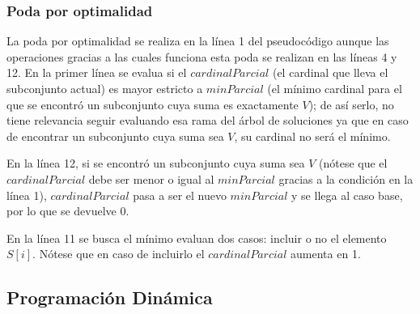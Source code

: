 \subsubsection{Poda por optimalidad}
\par La poda por optimalidad se realiza en la l\'inea 1 del pseudoc\'odigo aunque las operaciones gracias a las
cuales funciona esta poda se realizan en las l\'ineas 4 y 12. En la primer l\'inea se evalua si el $cardinalParcial$
(el cardinal que lleva el subconjunto actual) es mayor estricto a $minParcial$ (el m\'inimo cardinal para el que
se encontr\'o un subconjunto cuya suma es exactamente $V$); de as\'i serlo, no tiene relevancia seguir evaluando
esa rama del \'arbol de soluciones ya que en caso de encontrar un subconjunto cuya suma sea $V$, su cardinal no ser\'a
el m\'inimo.
\par En la l\'inea 12, si se encontr\'o un subconjunto cuya suma sea $V$ (n\'otese que el $cardinalParcial$ debe
ser menor o igual al $minParcial$ gracias a la condici\'on en la l\'inea 1), $cardinalParcial$ pasa a ser el nuevo
$minParcial$ y se llega al caso base, por lo que se devuelve 0.
\par En la l\'inea 11 se busca el m\'inimo evaluan dos casos: incluir o no el elemento $S[i]$. N\'otese que en caso
de incluirlo el $cardinalParcial$ aumenta en 1.

\subsection{Programaci\'on Din\'amica}

